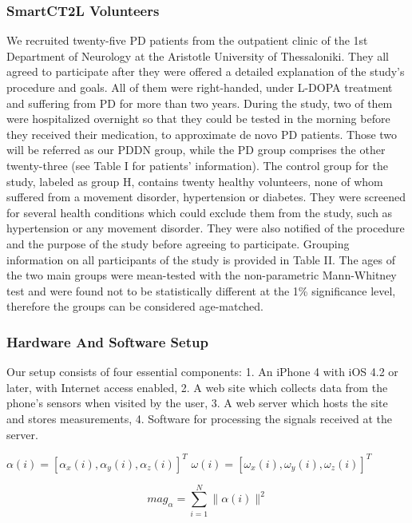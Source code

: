 \subsubsection{SmartCT2L Volunteers}
\label{subsubsec:smartCT2LVolunteers}
We recruited twenty-five PD patients from the outpatient clinic of the 1st Department of Neurology at the Aristotle University of Thessaloniki. They all agreed to participate after they were offered a detailed explanation of the study’s procedure and goals. All of them were right-handed, under L-DOPA treatment and suffering from PD for more than two years. During the study, two of them were hospitalized overnight so that they could be tested in the morning before they received their medication, to approximate de novo PD patients. Those two will be referred as our PDDN group, while the PD group comprises the other twenty-three (see Table I for patients’ information). 
The control group for the study, labeled as group H, contains twenty healthy volunteers, none of whom suffered from a movement disorder, hypertension or diabetes. They were screened for several health conditions which could exclude them from the study, such as hypertension or any movement disorder. They were also notified of the procedure and the purpose of the study before agreeing to participate. Grouping information on all participants of the study is provided in Table II. 
The ages of the two main groups were mean-tested with the non-parametric Mann-Whitney test and were found not to be statistically different at the 1\% significance level, therefore the groups can be considered age-matched. 

\subsubsection{Hardware And Software Setup}
\label{subsubsec:smartCT2SetUp}
Our setup consists of four essential components:
1. An iPhone 4 with iOS 4.2 or later, with Internet access enabled,
2. A web site which collects data from the phone’s sensors when visited by the user,
3. A web server which  hosts the site and stores measurements,
4. Software for processing the signals received at the server.



$\alpha(i) = [\alpha_{x}(i),\alpha_{y}(i),\alpha_{z}(i)]^{T}$
$\omega(i) = [\omega_{x}(i),\omega_{y}(i),\omega_{z}(i)]^{T}$


\begin{equation}
mag_{\alpha} = \sum_{i=1}^{N} \|\alpha(i)\|^{2}
\end{equation}

